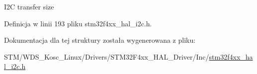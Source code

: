 I2C transfer size 

Definicja w linii 193 pliku stm32f4xx\+\_\+hal\+\_\+i2c.\+h.



Dokumentacja dla tej struktury została wygenerowana z pliku\+:\begin{DoxyCompactItemize}
\item 
S\+T\+M/\+W\+D\+S\+\_\+\+Kosc\+\_\+\+Linux/\+Drivers/\+S\+T\+M32\+F4xx\+\_\+\+H\+A\+L\+\_\+\+Driver/\+Inc/\hyperlink{stm32f4xx__hal__i2c_8h}{stm32f4xx\+\_\+hal\+\_\+i2c.\+h}\end{DoxyCompactItemize}
